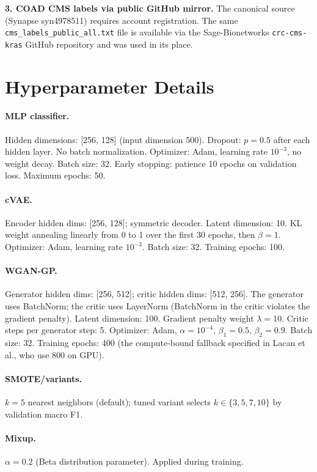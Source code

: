 \documentclass{article}
\begin{document}
\textbf{3. COAD CMS labels via public GitHub mirror.} The canonical source (Synapse syn4978511)
requires account registration. The same \texttt{cms\_labels\_public\_all.txt} file is available
via the Sage-Bionetworks \texttt{crc-cms-kras} GitHub repository and was used in its place.

\section{Hyperparameter Details}
\label{app:hyperparams}

\paragraph{MLP classifier.} Hidden dimensions: [256, 128] (input dimension 500). Dropout:
$p=0.5$ after each hidden layer. No batch normalization. Optimizer: Adam, learning rate
$10^{-3}$, no weight decay. Batch size: 32. Early stopping: patience 10 epochs on validation
loss. Maximum epochs: 50.

\paragraph{cVAE.} Encoder hidden dims: [256, 128]; symmetric decoder. Latent dimension: 10.
KL weight annealing linearly from 0 to 1 over the first 30 epochs, then $\beta=1$. Optimizer:
Adam, learning rate $10^{-3}$. Batch size: 32. Training epochs: 100.

\paragraph{WGAN-GP.} Generator hidden dims: [256, 512]; critic hidden dims: [512, 256]. The
generator uses BatchNorm; the critic uses LayerNorm (BatchNorm in the critic violates the
gradient penalty). Latent dimension: 100. Gradient penalty weight $\lambda=10$. Critic steps
per generator step: 5. Optimizer: Adam, $\alpha=10^{-4}$, $\beta_1=0.5$, $\beta_2=0.9$.
Batch size: 32. Training epochs: 400 (the compute-bound fallback specified in Lacan et al.,
who use 800 on GPU).

\paragraph{SMOTE/variants.} $k=5$ nearest neighbors (default); tuned variant selects
$k \in \{3, 5, 7, 10\}$ by validation macro F1.

\paragraph{Mixup.} $\alpha=0.2$ (Beta distribution parameter). Applied during training.
\end{document}
